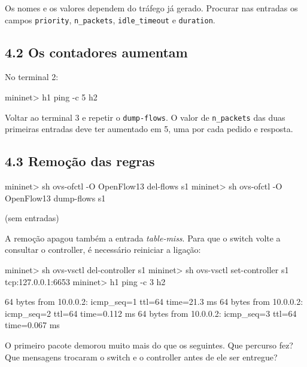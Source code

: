 \documentclass[11pt,a4paper]{article}
\newcommand{\cmd}[1]{\texttt{#1}}
\begin{document}
Os nomes e os valores dependem do tráfego já gerado. Procurar nas entradas os campos \cmd{priority}, \cmd{n\_packets}, \cmd{idle\_timeout} e \cmd{duration}.

\subsection*{4.2 Os contadores aumentam}

No terminal 2:

\begin{terminal}
mininet> h1 ping -c 5 h2
\end{terminal}

Voltar ao terminal 3 e repetir o \cmd{dump-flows}. O valor de \cmd{n\_packets} das duas primeiras entradas deve ter aumentado em 5, uma por cada pedido e resposta.

\subsection*{4.3 Remoção das regras}

\begin{terminal}
mininet> sh ovs-ofctl -O OpenFlow13 del-flows s1
mininet> sh ovs-ofctl -O OpenFlow13 dump-flows s1
\end{terminal}

\begin{saida}
(sem entradas)
\end{saida}

A remoção apagou também a entrada \emph{table-miss}. Para que o switch volte a consultar o controller, é necessário reiniciar a ligação:

\begin{terminal}
mininet> sh ovs-vsctl del-controller s1
mininet> sh ovs-vsctl set-controller s1 tcp:127.0.0.1:6653
mininet> h1 ping -c 3 h2
\end{terminal}

\begin{saida}
64 bytes from 10.0.0.2: icmp_seq=1 ttl=64 time=21.3 ms
64 bytes from 10.0.0.2: icmp_seq=2 ttl=64 time=0.112 ms
64 bytes from 10.0.0.2: icmp_seq=3 ttl=64 time=0.067 ms
\end{saida}

\begin{observe}
O primeiro pacote demorou muito mais do que os seguintes. Que percurso fez? Que mensagens trocaram o switch e o controller antes de ele ser entregue?
\end{observe}
\end{document}
